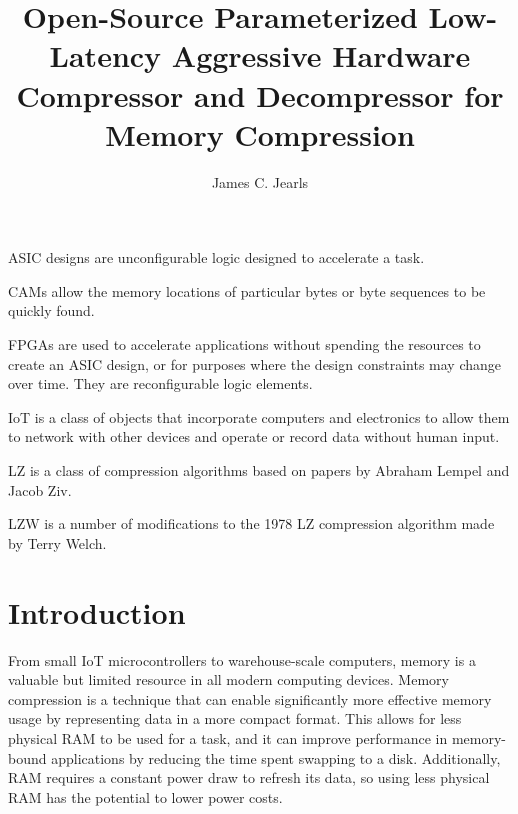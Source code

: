 \documentclass[doublespace,draft,nopageskip]{VTthesis} %
\title{Open-Source Parameterized Low-Latency Aggressive Hardware Compressor and Decompressor for Memory Compression}
\author{James C. Jearls}
\begin{document}
  \frontmatter
  \maketitle
  \tableofcontents

	\listoffigures
	\listoftables
    \printnomenclature %


ASIC designs are unconfigurable logic designed to accelerate a task.


CAMs allow the memory locations of particular bytes or byte sequences to be quickly found.


FPGAs are used to accelerate applications without spending the resources to create an ASIC design, or for purposes where the design constraints may change over time. They are reconfigurable logic elements.


IoT is a class of objects that incorporate computers and electronics to allow them to network with other devices and operate or record data without human input.


LZ is a class of compression algorithms based on papers by Abraham Lempel and Jacob Ziv.
 
 
LZW is a number of modifications to the 1978 LZ compression algorithm made by Terry Welch.
 

\mainmatter

\chapter{Introduction} \label{ch:introduction}
From small IoT microcontrollers to warehouse-scale computers, memory is a valuable but limited resource in all modern computing devices. Memory compression is a technique that can enable significantly more effective memory usage by representing data in a more compact format. This allows for less physical RAM to be used for a task, and it can improve performance in memory-bound applications by reducing the time spent swapping to a disk. Additionally, RAM requires a constant power draw to refresh its data, so using less physical RAM has the potential to lower power costs.
\end{document}
